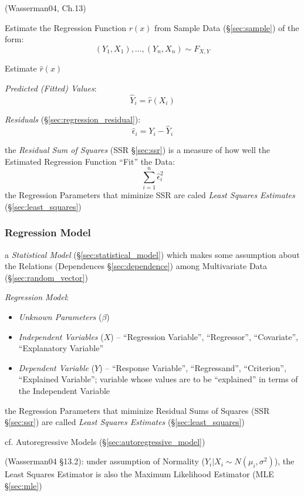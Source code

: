 \asterism

(Wasserman04, Ch.13)

Estimate the Regression Function $r(x)$ from Sample Data (\S\ref{sec:sample}) of
the form:
\[
  (Y_1,X_1), \ldots, (Y_n,X_n) \sim F_{X,Y}
\]

Estimate $\hat{r}(x)$

\emph{Predicted (Fitted) Values}:
\[
  \hat{Y}_i = \hat{r}(X_i)
\]

\emph{Residuals} (\S\ref{sec:regression_residual}):
\[
  \hat{\epsilon}_i = Y_i - \hat{Y}_i
\]

the \emph{Residual Sum of Squares} (SSR \S\ref{sec:ssr}) is a measure of how
well the Estimated Regression Function ``Fit'' the Data:
\[
  \sum_{i=1}^n \hat{\epsilon}_i^2
\]
the Regression Parameters that miminize SSR are caled \emph{Least Squares
  Estimates} (\S\ref{sec:least_squares})



\subsubsection{Regression Model}\label{sec:regression_model}

a \emph{Statistical Model} (\S\ref{sec:statistical_model}) which makes some
assumption about the Relations (Dependences \S\ref{sec:dependence}) among
Multivariate Data (\S\ref{sec:random_vector})

\emph{Regression Model}:
\begin{itemize}
  \item \emph{Unknown Parameters} ($\beta$)
  \item \emph{Independent Variables} ($X$) -- ``Regression Variable'',
    ``Regressor'', ``Covariate'', ``Explanatory Variable''
  \item \emph{Dependent Variable} ($Y$) -- ``Response Variable'',
    ``Regressand'', ``Criterion'', ``Explained Variable''; variable whose values
    are to be ``explained'' in terms of the Independent Variable
\end{itemize}

the Regression Parameters that miminize Residual Sums of Squares (SSR
\S\ref{sec:ssr}) are called \emph{Least Squares Estimates}
(\S\ref{sec:least_squares})

cf. Autoregressive Models (\S\ref{sec:autoregressive_model})

(Wasserman04 \S13.2):
 under assumption of Normality ($Y_i | X_i \sim N(\mu_i, \sigma^2)$), the Least
 Squares Estimator is also the Maximum Likelihood Estimator (MLE
 \S\ref{sec:mle})

